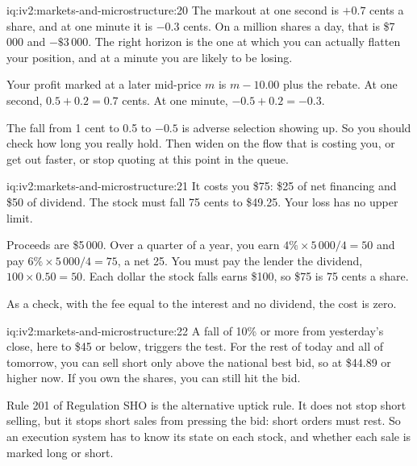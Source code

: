 \begin{solution}{iq:iv2:markets-and-microstructure:20}
The markout at one second is $+0.7$ cents a share, and at one minute it is $-0.3$ cents. On a million shares a day, that is \$7\,000 and $-\$3\,000$. The right horizon is the one at which you can actually flatten your position, and at a minute you are likely to be losing.

Your profit marked at a later mid-price $m$ is $m - 10.00$ plus the rebate. At one second, $0.5 + 0.2 = 0.7$ cents. At one minute, $-0.5 + 0.2 = -0.3$.

The fall from 1 cent to 0.5 to $-0.5$ is adverse selection showing up. So you should check how long you really hold. Then widen on the flow that is costing you, or get out faster, or stop quoting at this point in the queue.

\end{solution}

\begin{solution}{iq:iv2:markets-and-microstructure:21}
It costs you \$75: \$25 of net financing and \$50 of dividend. The stock must fall 75 cents to \$49.25. Your loss has no upper limit.

Proceeds are \$5\,000. Over a quarter of a year, you earn $4\% \times 5\,000/4 = 50$ and pay $6\% \times 5\,000/4 = 75$, a net 25. You must pay the lender the dividend, $100 \times 0.50 = 50$. Each dollar the stock falls earns \$100, so \$75 is 75 cents a share.

As a check, with the fee equal to the interest and no dividend, the cost is zero.

\end{solution}

\begin{solution}{iq:iv2:markets-and-microstructure:22}
A fall of 10\% or more from yesterday's close, here to \$45 or below, triggers the test. For the rest of today and all of tomorrow, you can sell short only above the national best bid, so at \$44.89 or higher now. If you own the shares, you can still hit the bid.

Rule 201 of Regulation SHO is the alternative uptick rule. It does not stop short selling, but it stops short sales from pressing the bid: short orders must rest. So an execution system has to know its state on each stock, and whether each sale is marked long or short.

\end{solution}

